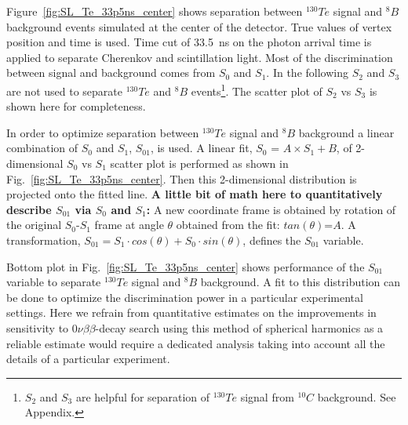 \documentclass[12pt,twoside,letterpaper]{article}
\newcommand{\vbb}{0\nu\beta\beta}
\newcommand{\Te}{^{130}Te}
\newcommand{\B}{^{8}B}
\newcommand{\Cten}{^{10}C}
\begin{document}
Figure~\ref{fig:SL_Te_33p5ns_center} shows separation between $\Te$ signal and $\B$ background events simulated at the center of the detector. True values of vertex position and time is used. Time cut of 33.5~ns on the photon arrival time is applied to separate Cherenkov and scintillation light. Most of the discrimination between signal and background comes from $S_0$ and $S_1$. In the following $S_2$ and $S_3$ are not used to separate $\Te$ and $\B$ events\footnote{$S_2$ and $S_3$ are helpful for separation of $\Te$ signal from $\Cten$ background. See Appendix.}. The scatter plot of $S_2$ vs $S_3$ is shown here for completeness. 

In order to optimize separation between $\Te$ signal and $\B$ background a linear combination of $S_0$ and $S_1$, $S_{01}$, is used. A linear fit, $S_0$ = $A \times S_1 + B$, of 2-dimensional $S_0$ vs $S_1$ scatter plot is performed as shown in Fig.~\ref{fig:SL_Te_33p5ns_center}. Then this 2-dimensional distribution is projected onto the fitted line. {\bf A little bit of math here to quantitatively describe $S_{01}$ via $S_0$ and $S_1$:} A new coordinate frame is obtained by rotation of the original $S_0$-$S_1$ frame at angle $\theta$ obtained from the fit: $tan(\theta)$=$A$. A transformation, $S_{01} = S_1 \cdot cos(\theta) + S_0 \cdot sin(\theta)$, defines the $S_{01}$ variable.

Bottom plot in Fig.~\ref{fig:SL_Te_33p5ns_center} shows performance of the $S_{01}$ variable to separate $\Te$ signal and $\B$ background. A fit to this distribution can be done to optimize the discrimination power in a particular experimental settings. Here we refrain from quantitative estimates on the improvements in sensitivity to $\vbb$-decay search using this method of spherical harmonics as a reliable estimate would require a dedicated analysis taking into account all the details of a particular experiment.
\end{document}
